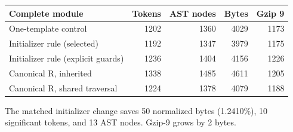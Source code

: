 \begin{center}
\small
\begin{tabular}{@{}lrrrr@{}}
\toprule
Complete module & Tokens & AST nodes & Bytes & Gzip 9\\
\midrule
One-template control & 1202 & 1360 & 4029 & 1173\\
Initializer rule (selected) & 1192 & 1347 & 3979 & 1175\\
Initializer rule (explicit guards) & 1236 & 1404 & 4156 & 1226\\
Canonical R, inherited & 1338 & 1485 & 4611 & 1205\\
Canonical R, shared traversal & 1224 & 1378 & 4079 & 1188\\
\bottomrule
\end{tabular}
\end{center}
The matched initializer change saves 50 normalized bytes (1.2410\%), 10 significant tokens, and 13 AST nodes. Gzip-9 grows by 2 bytes.
